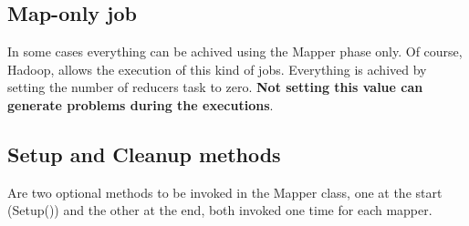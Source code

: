 \documentclass[12pt]{article}
\begin{document}
\subsection{Map-only job}
In some cases everything can be achived using the Mapper phase only. Of course, Hadoop, allows the execution of this kind of jobs. Everything is achived by setting the number of reducers task to zero. \textbf{Not setting this value can generate problems during the executions}.

\subsection{Setup and Cleanup methods}
Are two optional methods to be invoked in the Mapper class, one at the start (Setup()) and the other at the end, both invoked one time for each mapper.
\end{document}

